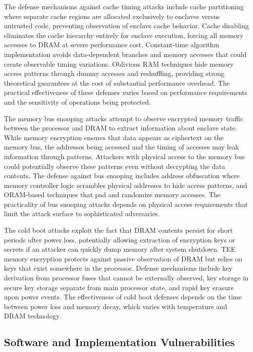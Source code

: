 The defense mechanisms against cache timing attacks include cache partitioning where separate cache regions are allocated exclusively to enclaves versus untrusted code, preventing observation of enclave cache behavior. Cache disabling eliminates the cache hierarchy entirely for enclave execution, forcing all memory accesses to DRAM at severe performance cost. Constant-time algorithm implementation avoids data-dependent branches and memory accesses that could create observable timing variations. Oblivious RAM techniques hide memory access patterns through dummy accesses and reshuffling, providing strong theoretical guarantees at the cost of substantial performance overhead. The practical effectiveness of these defenses varies based on performance requirements and the sensitivity of operations being protected.

The memory bus snooping attacks attempt to observe encrypted memory traffic between the processor and DRAM to extract information about enclave state. While memory encryption ensures that data appears as ciphertext on the memory bus, the addresses being accessed and the timing of accesses may leak information through patterns. Attackers with physical access to the memory bus could potentially observe these patterns even without decrypting the data contents. The defense against bus snooping includes address obfuscation where memory controller logic scrambles physical addresses to hide access patterns, and ORAM-based techniques that pad and randomize memory accesses. The practicality of bus snooping attacks depends on physical access requirements that limit the attack surface to sophisticated adversaries.

The cold boot attacks exploit the fact that DRAM contents persist for short periods after power loss, potentially allowing extraction of encryption keys or secrets if an attacker can quickly dump memory after system shutdown. TEE memory encryption protects against passive observation of DRAM but relies on keys that exist somewhere in the processor. Defense mechanisms include key derivation from processor fuses that cannot be externally observed, key storage in secure key storage separate from main processor state, and rapid key erasure upon power events. The effectiveness of cold boot defenses depends on the time between power loss and memory decay, which varies with temperature and DRAM technology.

\subsection{Software and Implementation Vulnerabilities}

